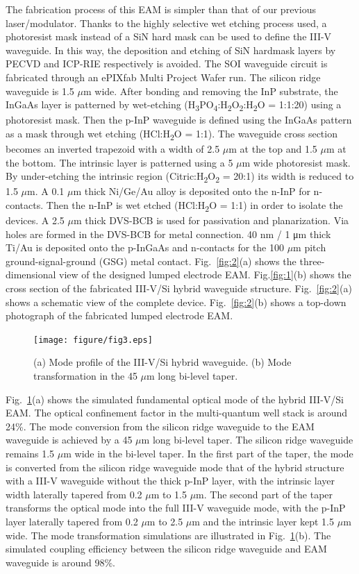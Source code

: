 \documentclass[aip,apl,reprint,a4paper]{revtex4-1}
\def\SB#1{\textsubscript{#1}}
\begin{document}
The fabrication process of this EAM is simpler than that of our previous laser/modulator.\cite{Transceiver,roelkensiii-v-on-silicon2015,fu52015} Thanks to the highly selective wet etching process used, a photoresist mask instead of a SiN hard mask can be used to define the III-V waveguide. In this way, the deposition and etching of SiN hardmask layers by PECVD and ICP-RIE respectively is avoided. The SOI waveguide circuit is fabricated through an ePIXfab Multi Project Wafer run.\cite{epixfab} The silicon ridge waveguide is 1.5 $\mu$m wide. After bonding and removing the InP substrate, the InGaAs layer is patterned by wet-etching (H\SB{3}PO\SB{4}:H\SB{2}O\SB{2}:H\SB{2}O = 1:1:20) using a photoresist mask. Then the p-InP waveguide is defined using the InGaAs pattern as a mask through wet etching (HCl:H\SB{2}O = 1:1). The waveguide cross section becomes an inverted trapezoid with a width of 2.5 $\mu$m at the top and 1.5 $\mu$m at the bottom. The intrinsic layer is patterned using a 5 $\mu$m wide photoresist mask. By under-etching the intrinsic region (Citric:H\SB{2}O\SB{2} = 20:1) its width is reduced to 1.5 $\mu$m. A 0.1 $\mu$m thick Ni/Ge/Au alloy is deposited onto the n-InP for n-contacts. Then the n-InP is wet etched (HCl:H\SB{2}O = 1:1) in order to isolate the devices. A 2.5 $\mu$m thick DVS-BCB is used for passivation and planarization. Via holes are formed in the DVS-BCB for metal connection. 40 nm / 1 μm thick Ti/Au is deposited onto the p-InGaAs and n-contacts for the 100 $\mu$m pitch ground-signal-ground (GSG) metal contact. Fig.~\ref{fig:2}(a) shows the three-dimensional view of the designed lumped electrode EAM. Fig.\ref{fig:1}(b) shows the cross section of the fabricated III-V/Si hybrid waveguide structure. Fig.~\ref{fig:2}(a) shows a schematic view of the complete device. Fig.~\ref{fig:2}(b) shows a top-down photograph of the fabricated lumped electrode EAM.


\begin{figure}
	\texttt{[image: figure/fig3.eps]}%
	\caption{\label{fig:3} (a) Mode profile of the III-V/Si hybrid waveguide. (b) Mode transformation in the 45 $\mu$m long bi-level taper.}
\end{figure}

Fig.~\ref{fig:3}(a) shows the simulated fundamental optical mode of the hybrid III-V/Si EAM. The optical confinement factor in the multi-quantum well stack is around 24\%. The mode conversion from the silicon ridge waveguide to the EAM waveguide is achieved by a 45 $\mu$m long bi-level taper.\cite{fu52015,huang2015ultracompact} The silicon ridge waveguide remains 1.5 $\mu$m wide in the bi-level taper. In the first part of the taper, the mode is converted from the silicon ridge waveguide mode that of the hybrid structure with a III-V waveguide without the thick p-InP layer, with the intrinsic layer width laterally tapered from 0.2 $\mu$m to 1.5 $\mu$m. The second part of the taper transforms the optical mode into the full III-V waveguide mode, with the p-InP layer laterally tapered from 0.2 $\mu$m to 2.5 $\mu$m and the intrinsic layer kept 1.5 $\mu$m wide. The mode transformation simulations are illustrated in Fig.~\ref{fig:3}(b). The simulated coupling efficiency between the silicon ridge waveguide and EAM waveguide is around 98\%.
\end{document}
